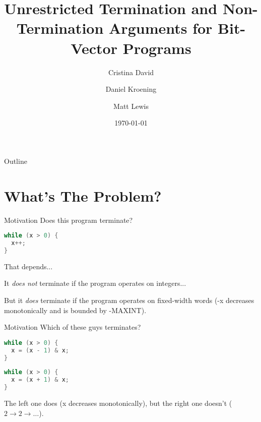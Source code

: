\documentclass[xcolor=pdftex,t,11pt]{beamer}
\author{Cristina David \and Daniel Kroening \and Matt Lewis}
\title{Unrestricted Termination and Non-Termination Arguments for Bit-Vector Programs}
\institute{Oxford University}
\date{\today}
\begin{document}

\begin{frame}[plain]
  \titlepage
\end{frame}

\begin{frame}{Outline}
  \tableofcontents
\end{frame}

\section{What's The Problem?}
\begin{frame}[fragile]{Motivation}
Does this program terminate?
\begin{center}
\begin{minipage}{0.4\linewidth}
 \begin{lstlisting}[language=C,basicstyle=\normalsize]
while (x > 0) {
  x++;
}
 \end{lstlisting}
\end{minipage}
\end{center}

\pause

That depends...

It \emph{does not} terminate if the program operates on integers...

But it \emph{does} terminate if the program operates on fixed-width words
(-x decreases monotonically and is bounded by -MAXINT).

\end{frame}

\begin{frame}[fragile]{Motivation}
Which of these guys terminates?
\begin{center}
\begin{minipage}{0.45\linewidth}
 \begin{lstlisting}[language=C,basicstyle=\normalsize]
while (x > 0) {
  x = (x - 1) & x;
}
\end{lstlisting}
\end{minipage}
\begin{minipage}{0.45\linewidth}
 \begin{lstlisting}[language=C,basicstyle=\normalsize]
while (x > 0) {
  x = (x + 1) & x;
}
\end{lstlisting}
\end{minipage}
\end{center}

\pause

The left one does (x decreases monotonically), but the right one doesn't ($2 \rightarrow 2 \rightarrow \dots$).
\end{frame}
\end{document}
